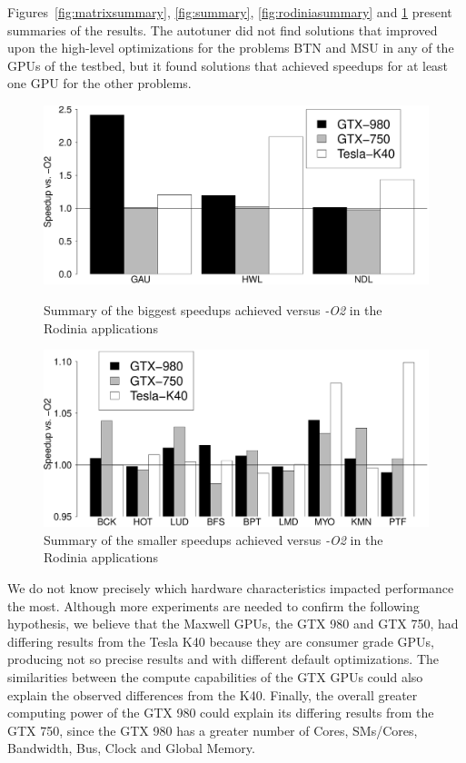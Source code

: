 Figures~\ref{fig:matrixsummary}, \ref{fig:summary}, \ref{fig:rodiniasummary}
and \ref{fig:rodiniasummarysmall} present summaries of the results. The
autotuner did not find solutions that improved upon the high-level
optimizations for the problems BTN and MSU in any of the GPUs of the testbed,
but it found solutions that achieved speedups for at least one GPU for the
other problems.

\begin{figure}[htpb]
    \centering
    \begin{minipage}{.48\textwidth}
        \centering
        \includegraphics[scale=.15]{./images/RodiniaSummary.eps}
        \caption{Summary of the biggest speedups achieved versus \emph{-O2} in the Rodinia applications}
        \label{fig:rodiniasummary}
    \end{minipage}%
    \hfill
    \begin{minipage}{.48\textwidth}
        \centering
        \includegraphics[scale=.15]{./images/RodiniaSummary_small.eps}
        \caption{Summary of the smaller speedups achieved versus \emph{-O2} in the Rodinia applications}
        \label{fig:rodiniasummarysmall}
    \end{minipage}%
\end{figure}

We do not know precisely which hardware characteristics impacted performance
the most.  Although more experiments are needed to confirm the following
hypothesis, we believe that the Maxwell GPUs, the GTX 980 and GTX 750, had
differing results from the Tesla K40 because they are consumer grade GPUs,
producing not so precise results and with different default optimizations. The
similarities between the compute capabilities of the GTX GPUs could also
explain the observed differences from the K40. Finally, the overall greater
computing power of the GTX 980 could explain its differing results from the GTX
750, since the GTX 980 has a greater number of Cores, SMs/Cores, Bandwidth,
Bus, Clock and Global Memory.

